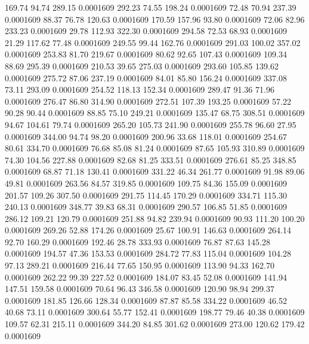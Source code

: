  169.74   94.74  289.15   0.0001609
 292.23   74.55  198.24   0.0001609
  72.48   70.94  237.39   0.0001609
  88.37   76.78  120.63   0.0001609
 170.59  157.96   93.80   0.0001609
  72.06   82.96  233.23   0.0001609
  29.78  112.93  322.30   0.0001609
 294.58   72.53   68.93   0.0001609
  21.29  117.62   77.48   0.0001609
 249.55   99.44  162.76   0.0001609
 291.03  100.02  357.02   0.0001609
 253.83   81.70  219.67   0.0001609
  80.62   92.65  107.43   0.0001609
 109.34   88.69  295.39   0.0001609
 210.53   39.65  275.03   0.0001609
 293.60  105.85  139.62   0.0001609
 275.72   87.06  237.19   0.0001609
  84.01   85.80  156.24   0.0001609
 337.08   73.11  293.09   0.0001609
 254.52  118.13  152.34   0.0001609
 289.47   91.36   71.96   0.0001609
 276.47   86.80  314.90   0.0001609
 272.51  107.39  193.25   0.0001609
  57.22   90.28   90.44   0.0001609
  88.85   75.10  249.21   0.0001609
 135.47   68.75  308.51   0.0001609
  94.67  104.61   79.74   0.0001609
 265.20  105.73  241.90   0.0001609
 255.78   96.60   27.95   0.0001609
 344.00   94.74   98.20   0.0001609
 200.96   33.68  118.01   0.0001609
 254.67   80.61  334.70   0.0001609
  76.68   85.08   81.24   0.0001609
  87.65  105.93  310.89   0.0001609
  74.30  104.56  227.88   0.0001609
  82.68   81.25  333.51   0.0001609
 276.61   85.25  348.85   0.0001609
  68.87   71.18  130.41   0.0001609
 331.22   46.34  261.77   0.0001609
  91.98   89.06   49.81   0.0001609
 263.56   84.57  319.85   0.0001609
 109.75   84.36  155.09   0.0001609
 201.57  109.26  307.50   0.0001609
 291.75  114.45  170.29   0.0001609
 334.71  115.30  240.13   0.0001609
 348.77   39.83   68.31   0.0001609
 290.57  106.85   51.85   0.0001609
 286.12  109.21  120.79   0.0001609
 251.88   94.82  239.94   0.0001609
  90.93  111.20  100.20   0.0001609
 269.26   52.88  174.26   0.0001609
  25.67  100.91  146.63   0.0001609
 264.14   92.70  160.29   0.0001609
 192.46   28.78  333.93   0.0001609
  76.87   87.63  145.28   0.0001609
 194.57   47.36  153.53   0.0001609
 284.72   77.83  115.04   0.0001609
 104.28   97.13  289.21   0.0001609
 216.44   77.65  150.95   0.0001609
 113.90   94.33  162.70   0.0001609
 262.22   99.39  227.52   0.0001609
 184.07   83.45   52.08   0.0001609
 141.94  147.51  159.58   0.0001609
  70.64   96.43  346.58   0.0001609
 120.90   98.94  299.37   0.0001609
 181.85  126.66  128.34   0.0001609
  87.87   85.58  334.22   0.0001609
  46.52   40.68   73.11   0.0001609
 300.64   55.77  152.41   0.0001609
 198.77   79.46   40.38   0.0001609
 109.57   62.31  215.11   0.0001609
 344.20   84.85  301.62   0.0001609
 273.00  120.62  179.42   0.0001609
